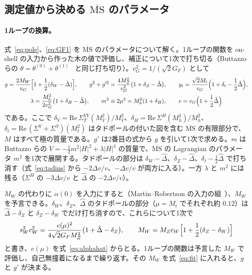 \documentclass[a4paper,10pt]{ltjsarticle}
\newcommand{\MSbar}{\overline{\mathrm{MS}}}
\newcommand{\re}{\mathrm{Re}\,}
\begin{document}
\subsection{測定値から決める $\MSbar$ のパラメータ}\label{sec:fit}

\paragraph{1ループの換算。}式~\eqref{eq:pole}、\eqref{eq:GF1} を $\MSbar$ のパラメータについて解く。1ループの関数を on-shell の入力から作った木の値で評価し、補正について1次で打ち切る（Buttazzo らの $\theta=\theta^{(0)}+\theta^{(1)}$~\cite{buttazzo13} と同じ打ち切り）。$v_G^2=1/(\sqrt2G_F)$ として
\begin{equation}
\begin{gathered}
g=\frac{2M_W}{v_G}\Bigl[1+\frac12(\delta_W-\hat\Delta)\Bigr],\qquad
g^2+g'^2=\frac{4M_Z^2}{v_G^2}\bigl(1+\delta_Z-\hat\Delta\bigr),\qquad
y_t=\frac{\sqrt2M_t}{v_G}\Bigl(1+\delta_t-\frac12\hat\Delta\Bigr),\\
\lambda=\frac{M_h^2}{2v_G^2}\bigl(1+\delta_H-\hat\Delta\bigr),\qquad
m^2\equiv2\mu^2=M_h^2(1+\delta_H),\qquad
v=v_G\Bigl(1+\frac12\hat\Delta\Bigr)
\end{gathered}
\label{eq:fit}
\end{equation}
である。ここで $\delta_V=\re\Sigma^{VV}_T(M_V^2)/M_V^2$、$\delta_H=\re\Sigma^H(M_h^2)/M_h^2$、$\delta_t=\re(\Sigma^V+\Sigma^S)(M_t^2)$ はタドポールの付いた図を含む $\MSbar$ の有限部分で、$M$ はすべて極の質量である。$g'$ は2番目の式から $g$ を引いて1次で求める。$m$ は Buttazzo らの $V=-\frac12m^2|H|^2+\lambda|H|^4$ の質量で、$\MSbar$ の Lagrangian のパラメータ $m^2$ を1次で展開する。タドポールの部分は $\delta_W-\hat\Delta$、$\delta_Z-\hat\Delta$、$\delta_t-\frac12\hat\Delta$ で打ち消す（式~\eqref{eq:tadins} から $-2\Delta v/v$、$-\Delta v/v$ が両方に入る）。一方 $\lambda$ と $m^2$ には残る（$\Sigma^H$ の $-3\Delta v/v$ と $\hat\Delta$ の $-2\Delta v/v$）。

$M_W$ の代わりに $\alpha(0)$ を入力にすると（Martin--Robertson の入力の組~\cite{mr19}）、$M_W$ を予言できる。$\delta_W$、$\delta_Z$、$\hat\Delta$ のタドポールの部分（$\mu=M_t$ でそれぞれ約 $0.12$）は $\hat\Delta-\delta_Z$ と $\delta_Z-\delta_W$ でだけ打ち消すので、これらについて1次で
\begin{equation}
s_W^2c_W^2=\frac{e(\mu)^2}{4\sqrt2G_FM_Z^2}\bigl(1+\hat\Delta-\delta_Z\bigr),\qquad
M_W=M_Zc_W\Bigl[1+\frac12(\delta_Z-\delta_W)\Bigr]
\label{eq:fitalpha}
\end{equation}
と書き、$e(\mu)$ を式~\eqref{eq:alphahat} からとる。1ループの関数は予言した $M_W$ で評価し、自己無撞着になるまで繰り返す。その $M_W$ を式~\eqref{eq:fit} に入れると、$g$ と $g'$ が決まる。
\end{document}
